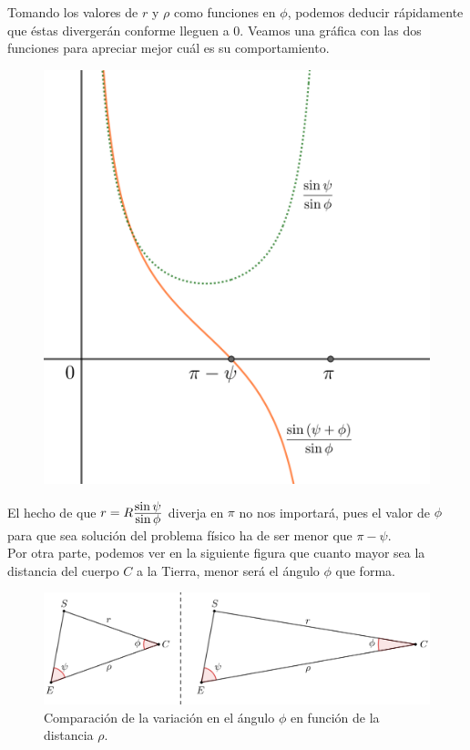 Tomando los valores de $r$ y $\rho$ como funciones en $\phi$, podemos deducir rápidamente que éstas divergerán conforme lleguen a 0. Veamos una gráfica con las dos funciones para apreciar mejor cuál es su comportamiento.
\begin{figure}[H]
\centering
\includegraphics[scale=0.15]{images/motivo_error.png}
\end{figure}

El hecho de que $r=R\frac{\displaystyle \sin{\psi}}{\displaystyle \sin{\phi}}$ diverja en $\pi$ no nos importará, pues el valor de $\phi$ para que sea solución del problema físico ha de ser menor que $\pi-\psi$.\\

Por otra parte, podemos ver en la siguiente figura que cuanto mayor sea la distancia del cuerpo $C$ a la Tierra, menor será el ángulo $\phi$ que forma.
\begin{figure}[H]
\centering
\includegraphics[scale=0.125]{images/bigger_rho_smaller_phi.png}
\caption{Comparación de la variación en el ángulo $\phi$ en función de la distancia $\rho$.}
\label{fig:bigger_rho_smaller_phi.png}
\end{figure}

